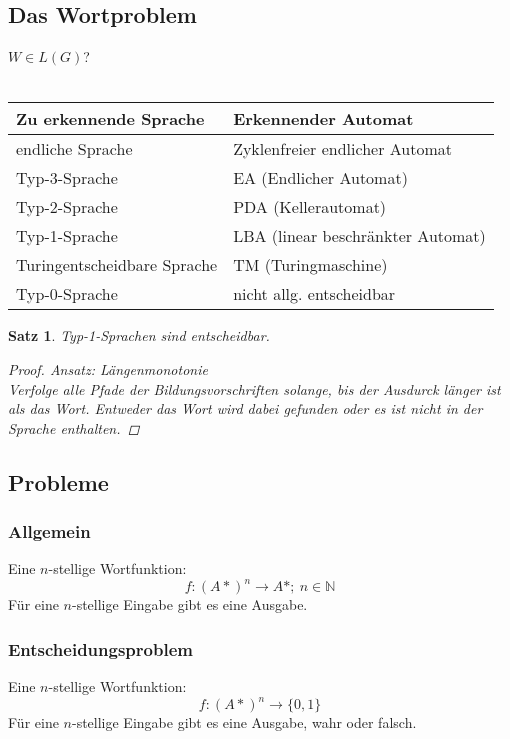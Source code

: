 \documentclass{article}
\begin{document}
\subsection{Das Wortproblem}
\Rightarrow $W\in L(G)$?\\\\
\begin{tabular}{l | l}
    Zu erkennende Sprache       & Erkennender Automat               \\\hline
    endliche Sprache            & Zyklenfreier endlicher Automat    \\
    Typ-3-Sprache               & EA (Endlicher Automat)            \\
    Typ-2-Sprache               & PDA (Kellerautomat)               \\
    Typ-1-Sprache               & LBA (linear beschränkter Automat) \\
    Turingentscheidbare Sprache & TM (Turingmaschine)               \\\hline
    Typ-0-Sprache               & nicht allg. entscheidbar
\end{tabular}
\begin{framed}
\newtheorem*{Typ-1-Entscheidbarkeit}{Satz}
\begin{Typ-1-Entscheidbarkeit}
Typ-1-Sprachen sind entscheidbar.
\begin{proof}
    Ansatz: Längenmonotonie\\
    Verfolge alle Pfade der Bildungsvorschriften solange, bis der Ausdurck länger ist als das Wort. Entweder das Wort wird dabei gefunden oder es ist nicht in der Sprache enthalten. \qedhere
\end{proof}
\end{Typ-1-Entscheidbarkeit}
\end{framed}
\subsection{Probleme}
\subsubsection{Allgemein}
Eine $n$-stellige Wortfunktion:
\begin{equation}
    f: \left(A*\right)^n \rightarrow A*; \: n \in \mathbb{N}
\end{equation}
F\"ur eine $n$-stellige Eingabe gibt es eine Ausgabe.
\subsubsection{Entscheidungsproblem}
Eine $n$-stellige Wortfunktion:
\begin{equation}
    f: \left(A*\right)^n \rightarrow\{0, 1\}
\end{equation}
F\"ur eine $n$-stellige Eingabe gibt es eine Ausgabe, wahr oder falsch.
\end{document}

